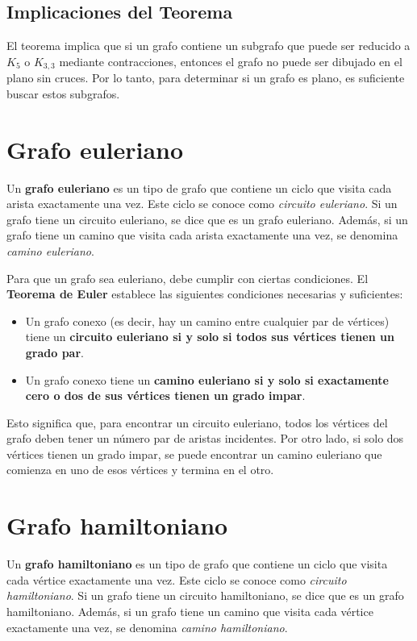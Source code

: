 \documentclass{article}
\begin{document}
\subsection{Implicaciones del Teorema}

El teorema implica que si un grafo contiene un subgrafo que puede ser reducido a $ K_5 $ o $ K_{3,3} $ mediante contracciones, entonces el grafo no puede ser dibujado en el plano sin cruces. Por lo tanto, para determinar si un grafo es plano, es suficiente buscar estos subgrafos.

\section{Grafo euleriano}

Un \textbf{grafo euleriano} es un tipo de grafo que contiene un ciclo que visita cada arista exactamente una vez. Este ciclo se conoce como \textit{circuito euleriano}. Si un grafo tiene un circuito euleriano, se dice que es un grafo euleriano. Además, si un grafo tiene un camino que visita cada arista exactamente una vez, se denomina \textit{camino euleriano}.

Para que un grafo sea euleriano, debe cumplir con ciertas condiciones. El \textbf{Teorema de Euler} establece las siguientes condiciones necesarias y suficientes:

\begin{itemize}
    \item Un grafo conexo (es decir, hay un camino entre cualquier par de vértices) tiene un \textbf{circuito euleriano si y solo si todos sus vértices tienen un grado par}.
    \item Un grafo conexo tiene un \textbf{camino euleriano si y solo si exactamente cero o dos de sus vértices tienen un grado impar}.
\end{itemize}

Esto significa que, para encontrar un circuito euleriano, todos los vértices del grafo deben tener un número par de aristas incidentes. Por otro lado, si solo dos vértices tienen un grado impar, se puede encontrar un camino euleriano que comienza en uno de esos vértices y termina en el otro.

\newpage

\section{Grafo hamiltoniano}

Un \textbf{grafo hamiltoniano} es un tipo de grafo que contiene un ciclo que visita cada vértice exactamente una vez. Este ciclo se conoce como \textit{circuito hamiltoniano}. Si un grafo tiene un circuito hamiltoniano, se dice que es un grafo hamiltoniano. Además, si un grafo tiene un camino que visita cada vértice exactamente una vez, se denomina \textit{camino hamiltoniano}.
\end{document}
